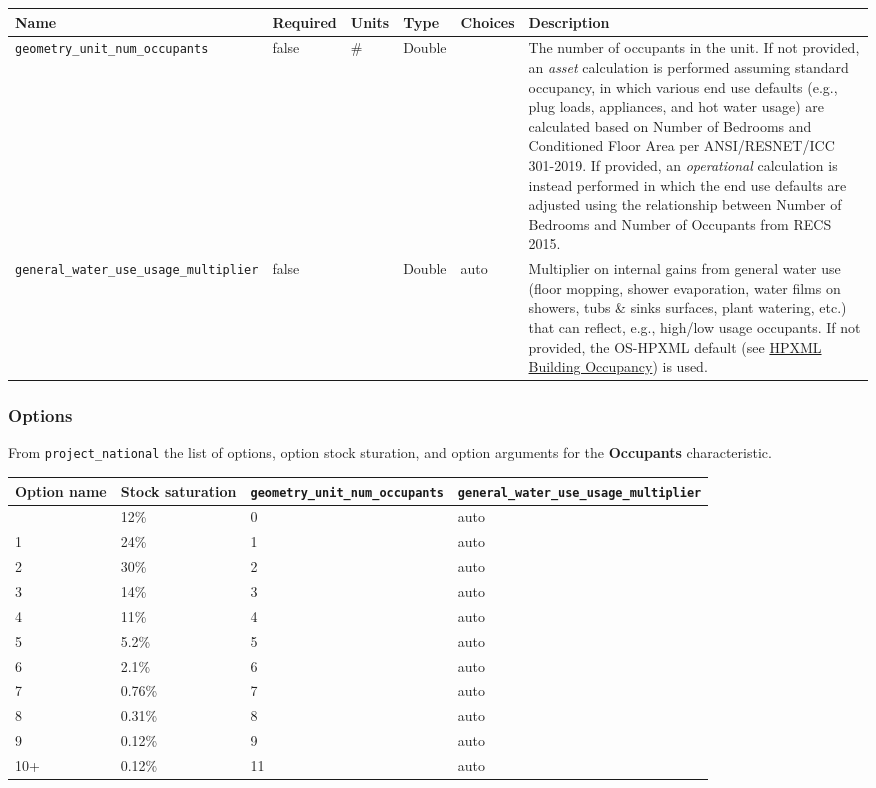 \begin{longtable}[]{@{}llllll@{}}
\toprule\noalign{}
Name & Required & Units & Type & Choices & Description \\
\midrule\noalign{}
\endhead
\bottomrule\noalign{}
\endlastfoot
\texttt{geometry\_unit\_num\_occupants} & false & \# & Double & & The
number of occupants in the unit. If not provided, an \emph{asset}
calculation is performed assuming standard occupancy, in which various
end use defaults (e.g., plug loads, appliances, and hot water usage) are
calculated based on Number of Bedrooms and Conditioned Floor Area per
ANSI/RESNET/ICC 301-2019. If provided, an \emph{operational} calculation
is instead performed in which the end use defaults are adjusted using
the relationship between Number of Bedrooms and Number of Occupants from
RECS 2015. \\
\texttt{general\_water\_use\_usage\_multiplier} & false & & Double &
auto & Multiplier on internal gains from general water use (floor
mopping, shower evaporation, water films on showers, tubs \& sinks
surfaces, plant watering, etc.) that can reflect, e.g., high/low usage
occupants. If not provided, the OS-HPXML default (see
\href{https://openstudio-hpxml.readthedocs.io/en/v1.7.0/workflow_inputs.html\#hpxml-building-occupancy}{HPXML
Building Occupancy}) is used. \\
\end{longtable}

\subsubsection{Options}\label{options-126}

From \texttt{project\_national} the list of options, option stock
sturation, and option arguments for the \textbf{Occupants}
characteristic.

\begin{longtable}[]{@{}llll@{}}
\toprule\noalign{}
Option name & Stock saturation & \texttt{geometry\_unit\_num\_occupants}
& \texttt{general\_water\_use\_usage\_multiplier} \\
\midrule\noalign{}
\endhead
\bottomrule\noalign{}
\endlastfoot
0 & 12\% & 0 & auto \\
1 & 24\% & 1 & auto \\
2 & 30\% & 2 & auto \\
3 & 14\% & 3 & auto \\
4 & 11\% & 4 & auto \\
5 & 5.2\% & 5 & auto \\
6 & 2.1\% & 6 & auto \\
7 & 0.76\% & 7 & auto \\
8 & 0.31\% & 8 & auto \\
9 & 0.12\% & 9 & auto \\
10+ & 0.12\% & 11 & auto \\
\end{longtable}

